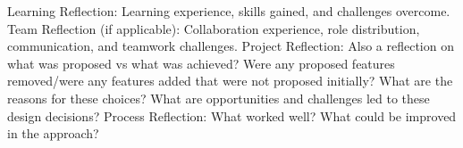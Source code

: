 Learning Reflection: Learning experience, skills gained, and challenges overcome.
Team Reflection (if applicable): Collaboration experience, role distribution, communication, and teamwork challenges.
Project Reflection: Also a reflection on what was proposed vs what was achieved? Were any proposed features removed/were any features added that were not proposed initially? What are the reasons for these choices? What are opportunities and challenges led to these design decisions?
Process Reflection: What worked well? What could be improved in the approach?
